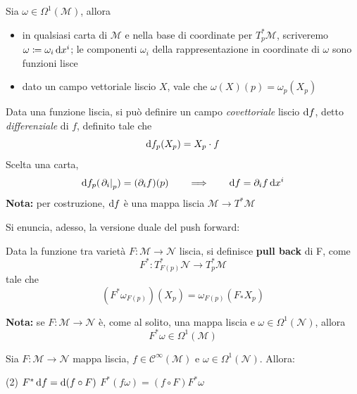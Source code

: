 \begin{lemma}
    Sia $\omega \in \Omega^1(\mathcal{M})$, allora
    \begin{itemize}
        \item in qualsiasi carta di $\mathcal{M}$ e nella base di coordinate per $T^*_p\mathcal{M}$, scriveremo $\omega \coloneqq \omega_i \odif{x^i}$; le componenti $\omega_i$ della rappresentazione in coordinate di $\omega$ sono funzioni lisce
        \item dato un campo vettoriale liscio $X$, vale che $\omega(X)(p)=\omega_p(X_p)$
    \end{itemize}
\end{lemma}
Data una funzione liscia, si può definire un campo \emph{covettoriale} liscio $\odif{f}$, detto \emph{differenziale} di $f$, definito tale che
\begin{equation}
    \odif{f_p}(X_p) = X_p \cdot f
\end{equation}
Scelta una carta,
\begin{equation}
    \odif{f_p}(\left.\partial_i\right|_p) = (\partial_i f)(p) \qquad \Longrightarrow \qquad \odif{f} = \partial_i f \odif{x^i}
\end{equation}
\textbf{Nota:} per costruzione, $\odif{f}$ è una mappa liscia $\mathcal{M} \rightarrow T^*\mathcal{M}$

Si enuncia, adesso, la versione duale del push forward:
\begin{definition}
    Data la funzione tra varietà $F : \mathcal{M} \rightarrow \mathcal{N}$ liscia, si definisce \textbf{pull back} di F, come
    \[
        F^* : T^*_{F(p)}\mathcal{N} \rightarrow T^*_p\mathcal{M}
    \]
    tale che
    \begin{equation}
        (F^* \omega_{F(p)})(X_p) = \omega_{F(p)}(F_* X_p)
    \end{equation}
\end{definition}
\textbf{Nota:} se $F : \mathcal{M} \rightarrow \mathcal{N}$ è, come al solito, una mappa liscia e $\omega \in \Omega^1(\mathcal{N})$, allora
\begin{equation}
    F^* \omega \in \Omega^1(\mathcal{M})
\end{equation}
\begin{property}
    Sia $F : \mathcal{M} \rightarrow \mathcal{N}$ mappa liscia, $f \in \mathcal{C}^\infty (\mathcal{M})$ e $\omega \in \Omega^1(\mathcal{N})$. Allora:
    \begin{tasks}[label=\arabic*.](2)
        \task $F^* \odif{f} = \odif{(f \circ F)}$
        \task $F^* (f \omega ) = (f \circ F) F^* \omega$
    \end{tasks}
\end{property}
